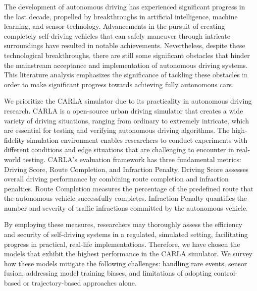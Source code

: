 The development of autonomous driving has experienced significant progress in the last decade, propelled by breakthroughs in artificial intelligence, machine learning, and sensor technology. Advancements in the pursuit of creating completely self-driving vehicles that can safely maneuver through intricate surroundings have resulted in notable achievements. Nevertheless, despite these technological breakthroughs, there are still some significant obstacles that hinder the mainstream acceptance and implementation of autonomous driving systems. This literature analysis emphasizes the significance of tackling these obstacles in order to make significant progress towards achieving fully autonomous cars.

We prioritize the CARLA simulator due to its practicality in autonomous driving research. CARLA is a open-source urban driving simulator that creates a wide variety of driving situations, ranging from ordinary to extremely intricate, which are essential for testing and verifying autonomous driving algorithms. The high-fidelity simulation environment enables researchers to conduct experiments with different conditions and edge situations that are challenging to encounter in real-world testing.
CARLA's evaluation framework has three fundamental metrics: Driving Score, Route Completion, and Infraction Penalty. Driving Score assesses overall driving performance by combining route completion and infraction penalties. Route Completion measures the percentage of the predefined route that the autonomous vehicle successfully completes. Infraction Penalty quantifies the number and severity of traffic infractions committed by the autonomous vehicle.

By employing these measures, researchers may thoroughly assess the efficiency and security of self-driving systems in a regulated, simulated setting, facilitating progress in practical, real-life implementations. Therefore, we have chosen the models that exhibit the highest performance in the CARLA simulator. We survey how these models mitigate the following challenges: handling rare events, sensor fusion, addressing model training biases, and limitations of adopting control-based or trajectory-based approaches alone.